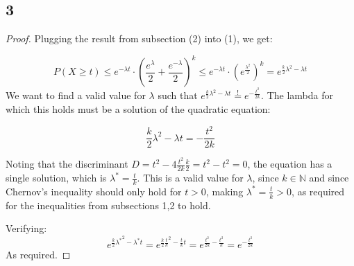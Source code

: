 \subsection*{3}
\begin{proof}
    Plugging the result from subsection (2) into (1), we get:
    
    \begin{equation*}
        P(X\geq t) \leq e^{-\lambda t}\cdot \left( \frac{e^\lambda}{2} + \frac{e^{-\lambda}}{2} \right)^k
        \leq e^{-\lambda t}\cdot \left( e^{\frac{\lambda^2}{2}} \right)^k = e^{\frac{k}{2}\lambda^2 - \lambda t}
    \end{equation*}
    We want to find a valid value for $\lambda$ such that $e^{\frac{k}{2}\lambda^2 - \lambda t} \overset{!}{=} e^{-\frac{t^2}{2k}}$.
    The lambda for which this holds must be a solution of the quadratic equation:
    
    \begin{equation*}
        \frac{k}{2}\lambda^2 - \lambda t = -\frac{t^2}{2k}
    \end{equation*}
    
    Noting that the discriminant $D = t^2 - 4 \frac{t^2}{2k} \frac{k}{2} = t^2 - t^2 = 0$, the equation has a single solution, which is $\lambda^* = \frac{t}{k}$.
    This is a valid value for $\lambda$, since $k\in \mathbb{N}$ and since Chernov's inequality should only hold for $t > 0$, making $\lambda^* = \frac{t}{k} > 0$, 
    as required for the inequalities from subsections 1,2 to hold.
    
    Verifying:
    \begin{equation*}
        e^{\frac{k}{2}{\lambda^*}^2 - \lambda^* t} = e^{\frac{k}{2}{\frac{t}{k}}^2 - \frac{t}{k} t} = e^{\frac{t^2}{2k} - \frac{t^2}{k}} = e^{-\frac{t^2}{2k}}
    \end{equation*}
    As required.    
\end{proof}